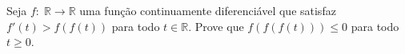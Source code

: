 Seja \(f\colon \;\mathbb{R}\to\mathbb{R}\) uma função continuamente diferenciável que satisfaz \(f'(t)>f(f(t))\) para todo \(t\in\mathbb{R}\). Prove que \(f(f(f(t)))\le0\) para todo \(t\ge0\).
